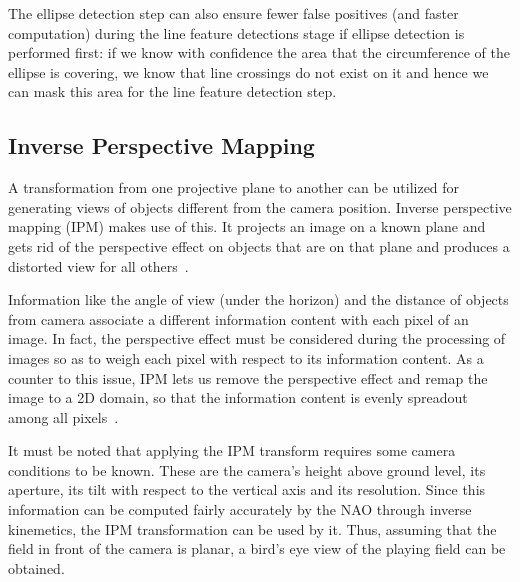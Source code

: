 \documentclass[	DIV=calc,%
							paper=a4,%
							fontsize=9pt,%
							twocolumn]{scrartcl}	 					%
\begin{document}
The ellipse detection step can also ensure fewer false positives (and faster computation) during the line feature detections stage if ellipse detection is performed first: if we know with confidence the area that the circumference of the ellipse is covering, we know that line crossings do not exist on it and hence we can mask this area for the line feature detection step.

\subsection{Inverse Perspective Mapping}
A transformation from one projective plane to another can be utilized for generating views of objects different from the camera position. Inverse perspective mapping (IPM) makes use of this. It projects an image on a known plane and gets rid of the perspective effect on objects that are on that plane and produces a distorted view for all others~\cite{IPM2}.

Information like the angle of view (under the horizon) and the distance of objects from camera associate a different information content with each pixel of an image. In fact, the perspective effect must be considered during the processing of images so as to weigh each pixel with respect to its information content. As a counter to this issue, IPM lets us remove the perspective effect and remap the image to a 2D domain, so that the information content is evenly spreadout among all pixels~\cite{IPMWeb}. 

It must be noted that applying the IPM transform requires some camera conditions to be known. These are the camera's height above ground level, its aperture, its tilt with respect to the vertical axis and its resolution. Since this information can be %
computed fairly accurately by the NAO through inverse kinemetics, the IPM transformation can be used by it. Thus, assuming that the field in front of the camera is planar, a bird's eye view of the playing field can be obtained.
\end{document}
